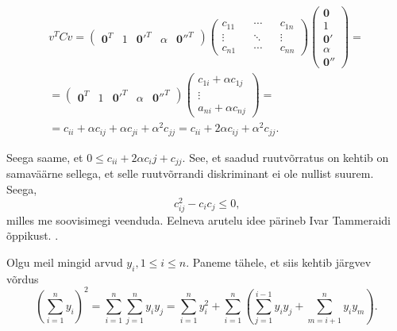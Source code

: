 \documentclass[a4paper,12pt,oneside]{article}
\numberwithin{equation}{section}
\theoremstyle{definition}
\begin{document}
\begin{equation*}
\begin{gathered}
v^{T}Cv =
\begin{pmatrix}
\mathbf{0}^T & 1 & \mathbf{0'}^T & \alpha & \mathbf{0''}^T
\end{pmatrix}
\begin{pmatrix}
c_{11} && \cdots && c_{1n} \\
\vdots && \ddots && \vdots \\
c_{n1} && \cdots && c_{nn}  
\end{pmatrix}
\begin{pmatrix}
\mathbf{0} \\ 
1 \\
\mathbf{0'} \\
\alpha \\
\mathbf{0''} 
\end{pmatrix}  =\\
= \begin{pmatrix}
\mathbf{0}^T & 1 & \mathbf{0'}^T & \alpha & \mathbf{0''}^T
\end{pmatrix}
\begin{pmatrix}
c_{1i} + \alpha c_{1j} \\
\vdots \\
a_{ni} + \alpha c_{nj} 
\end{pmatrix}
= \\
= c_{ii} + \alpha c_{ij} + \alpha c_{ji} + \alpha^2 c_{jj} = c_{ii} + 2 \alpha c_{ij} + \alpha^2 c_{jj} \text{.}
\end{gathered}
\end{equation*}


Seega saame, et $ 0 \leq c_{ii} + 2\alpha{c_ij} + c_{jj}$. See, et saadud ruutvõrratus on kehtib on samaväärne sellega, et selle ruutvõrrandi diskriminant ei ole nullist suurem. Seega,   
\begin{equation*}
c_{ij}^2 - c_{i}c_{j} \leq 0 \text{,} 
\end{equation*}
milles me soovisimegi veenduda. Eelneva arutelu idee pärineb Ivar Tammeraidi õppikust. \cite{Tammeraid1999}.  


Olgu meil mingid arvud $y_i, 1 \leq i  \leq n $. Paneme tähele, et siis kehtib järgvev võrdus 
\begin{equation*}
\left( \sum \limits_{i=1}^n y_{i} \right)^2 = \sum \limits_{i=1}^n \sum \limits_{j=1}^n y_{i} y_{j} =   \sum \limits_{i=1}^n y_{i}^2 + \sum \limits_{i=1}^n  \left( \sum \limits_{j=1}^{i-1} y_{i} y_{j} + \sum \limits_{m=i+1}^n {y_{i}}{y_{m}} \right) \text{.}
\end{equation*}
\end{document}
